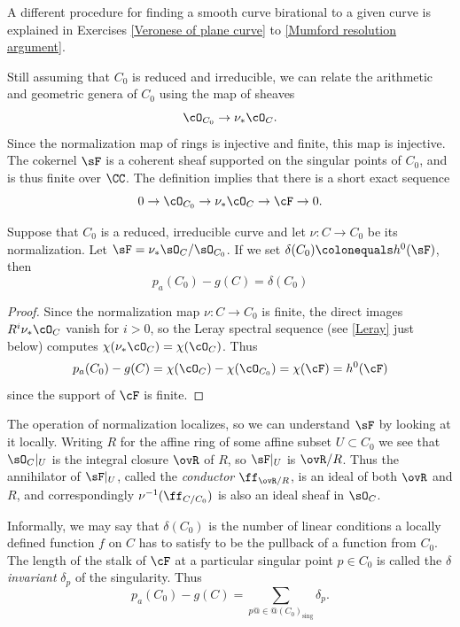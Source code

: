 A different procedure for finding a smooth curve birational to a given curve
is explained in 
Exercises \ref{Veronese of plane curve} to \ref{Mumford resolution argument}.


Still assuming that $C_0$ is reduced and irreducible, we can relate
%
%
%
the
arithmetic and geometric genera
of $C_0$ using the map of sheaves
$$
\cO_{C_0} \to \nu_*\cO_C.
$$
Since the normalization map of rings  is injective and finite, this map is injective. The cokernel $\sF$ is a coherent sheaf supported on the singular points of $C_0$, and is thus finite over $\CC$. 
The definition implies that there is a short exact sequence
$$
0 \to \cO_{C_0} \to \nu_*\cO_C \to \cF \to 0.
$$

\begin{proposition}\label{pa and delta}
Suppose that $C_{0}$ is a reduced, irreducible curve and let  $\nu: C\to C_{0}$ be its normalization.
Let $\sF = \nu_{*}\sO_{C}/\sO_{C_{0}}$. If we set 
$\delta(C_{0}) \colonequals h^{0}(\sF)$, 
then
 $$
p_a(C_0) - g(C) =  \delta(C_{0})
$$ 
\end{proposition}

\begin{proof}
 Since the normalization map $\nu: C \to C_0$ is finite,  the direct images $R^i\nu_*\cO_C$ vanish for $i > 0$, 
so the Leray spectral sequence 
(see \ref{Leray} just below)
computes $\chi(\nu_*\cO_C) = \chi(\cO_C)$. Thus
$$
p_a(C_0) - g(C) =  \chi(\cO_{C}) -   \chi(\cO_{C_0}) = \chi(\cF) = h^0(\cF) 
$$ 
since the support of $\cF$ is finite.
\end{proof}

The operation of normalization localizes, so we can understand $\sF$ by looking at it locally.
Writing $R$ for the affine ring of some affine subset $U\subset C_{0}$ we see that $\sO_{C}|_{U}$
is the integral closure $\ovR$ of $R$, so $\sF|_{U}$ is $\ovR/R$. Thus
the annihilator of $\sF|_{U}$, called the \emph{conductor}
$\ff_{\ovR/R}$,
is an ideal of both $\ovR$ and $R$,
and correspondingly $\nu^{-1}(\ff_{C/C_{0}})$ 
is also an ideal sheaf in $\sO_{C}$.

Informally, we may say that $\delta(C_{0})$ is the number of linear
conditions a locally defined function $f$ on $C$ has to satisfy to be
the pullback of a function from $C_0$. The length of the stalk of
$\cF$ at a particular singular point $p \in C_0$ is called the
%
\emph{$\delta$ invariant} $\delta_p$ of the singularity. Thus 
$$
p_a(C_0) - g(C) = \sum_{p @\in@ (C_0)_{\mathrm{sing}}\!\!} \delta_p.
$$ 

